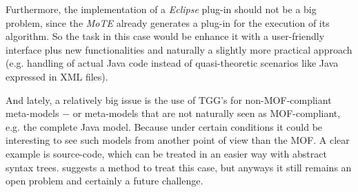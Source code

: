 \documentclass[tuberlin,cic,tc,english,noabntcite]{iiufrgs}
\begin{document}
Furthermore, the implementation of a \emph{Eclipse} plug-in should not be a big problem, since the \emph{MoTE} already generates a plug-in for the execution of its algorithm. So the task in this case would be enhance it with a user-friendly interface plus new functionalities and naturally a slightly more practical approach (e.g. handling of actual Java code instead of quasi-theoretic scenarios like Java expressed in XML files).

And lately, a relatively big issue is the use of TGG's for non-MOF-compliant meta-models $-$ or meta-models that are not naturally seen as MOF-compliant, e.g. the complete Java model. Because under certain conditions it could be interesting to see such models from another point of view than the MOF. A clear example is source-code, which can be treated in an easier way with abstract syntax trees. \citet{angyal2008novel} suggests a method to treat this case, but anyways it still remains an open problem and certainly a future challenge.



\end{document}
